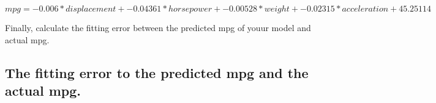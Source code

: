 \documentclass[]{article}
\newenvironment{Shaded}{\begin{snugshade}}{\end{snugshade}}
\newcommand{\StringTok}[1]{\textcolor[rgb]{0.31,0.60,0.02}{{#1}}}
\newcommand{\CommentTok}[1]{\textcolor[rgb]{0.56,0.35,0.01}{\textit{{#1}}}}
\newcommand{\NormalTok}[1]{{#1}}
\begin{document}
\[mpg = -0.006*displacement + -0.04361*horsepower + -0.00528*weight + -0.02315*acceleration 
 + 45.25114\]

Finally, calculate the fitting error between the predicted mpg of youur
model and actual mpg.

\subsection{The fitting error to the predicted mpg and the actual
mpg.}\label{the-fitting-error-to-the-predicted-mpg-and-the-actual-mpg.}

\begin{Shaded}
\end{Shaded}
\end{document}
